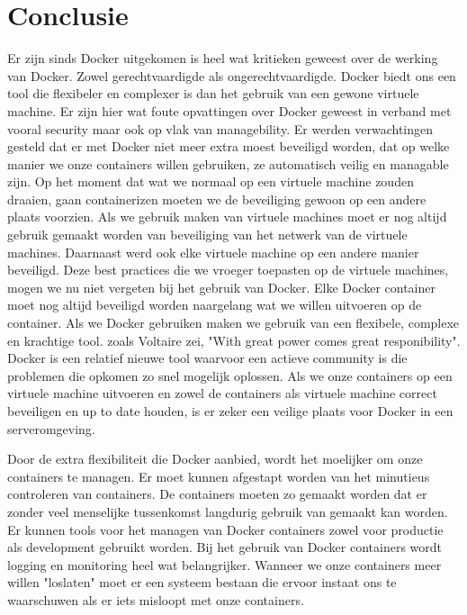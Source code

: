 \chapter{Conclusie}
\label{ch:conclusie}


Er zijn sinds Docker uitgekomen is heel wat kritieken geweest over de werking van Docker. Zowel gerechtvaardigde als ongerechtvaardigde. Docker biedt ons een tool die flexibeler en complexer is dan het gebruik van een gewone virtuele machine. Er zijn hier wat foute opvattingen over Docker geweest in verband met vooral security maar ook op vlak van managebility. Er werden verwachtingen gesteld dat er met Docker niet meer extra moest beveiligd worden, dat op welke manier we onze containers willen gebruiken, ze automatisch veilig en managable zijn. Op het moment dat wat we normaal op een virtuele machine zouden draaien, gaan containerizen moeten we de beveiliging gewoon op een andere plaats voorzien. Als we gebruik maken van virtuele machines moet er nog altijd gebruik gemaakt worden van beveiliging van het netwerk van de virtuele machines. Daarnaast werd ook elke virtuele machine op een andere manier beveiligd. Deze best practices die we vroeger toepasten op de virtuele machines, mogen we nu niet vergeten bij het gebruik van Docker. Elke Docker container moet nog altijd beveiligd worden naargelang wat we willen uitvoeren op de container. Als we Docker gebruiken maken we gebruik van een flexibele, complexe en krachtige tool. zoals Voltaire zei, "With great power comes great responibility". Docker is een relatief nieuwe tool waarvoor een actieve community is die problemen die opkomen zo snel mogelijk oplossen. Als we onze containers op een virtuele machine uitvoeren en zowel de containers als virtuele machine correct beveiligen en up to date houden, is er zeker een veilige plaats voor Docker in een serveromgeving.

Door de extra flexibiliteit die Docker aanbied, wordt het moelijker om onze containers te managen. Er moet kunnen afgestapt worden van het minutieus controleren van containers. De containers moeten zo gemaakt worden dat er zonder veel menselijke tussenkomst langdurig gebruik van gemaakt kan worden. Er kunnen tools voor het managen van Docker containers zowel voor productie als development gebruikt worden. Bij het gebruik van Docker containers wordt logging en monitoring heel wat belangrijker. Wanneer we onze containers meer willen "loslaten" moet er een systeem bestaan die ervoor instaat ons te waarschuwen als er iets misloopt met onze containers.

